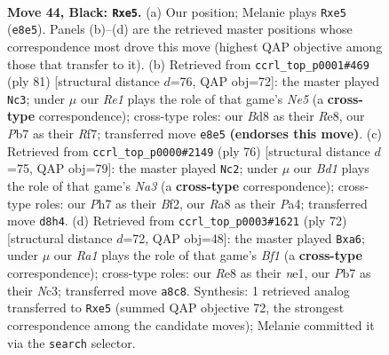 \documentclass[11pt]{article}
\begin{document}
\clearpage

\begin{figure}[p]\centering
\begin{subfigure}{0.46\textwidth}\centering
\resizebox{\linewidth}{!}{%
\newchessgame
\chessboard[
  setfen={r2br3/1p5p/nk4pP/p3Pp2/P2p4/3R2P1/1B2N3/R6K b - - 1 44},
  showmover=false,
  pgfstyle=straightmove, color=movearrow, markmove={e8-e5}
]}
\caption{}
\end{subfigure}\hfill
\begin{subfigure}{0.46\textwidth}\centering
\resizebox{\linewidth}{!}{%
\newchessgame
\chessboard[
  setfen={4r1k1/5r1p/5p2/R2p1P2/1p1PnN2/6P1/P3p2P/4R2K b - - 1 41},
  showmover=false,
  pgfstyle=straightmove, color=movearrow, markmove={e4-c3}
]}
\caption{}
\end{subfigure}
\\[4pt]
\begin{subfigure}{0.46\textwidth}\centering
\resizebox{\linewidth}{!}{%
\newchessgame
\chessboard[
  setfen={2k3r1/1pp5/5b2/2Pr1p2/PP1P1P2/N4K1p/5B1P/3R4 w - - 0 39},
  showmover=false,
  pgfstyle=straightmove, color=movearrow, markmove={a3-c2}
]}
\caption{}
\end{subfigure}\hfill
\begin{subfigure}{0.46\textwidth}\centering
\resizebox{\linewidth}{!}{%
\newchessgame
\chessboard[
  setfen={3rk3/5p1p/p3p1r1/6P1/5P2/P1N3R1/KPP4P/4nB2 w - - 2 37},
  showmover=false,
  pgfstyle=straightmove, color=movearrow, markmove={f1-a6}
]}
\caption{}
\end{subfigure}
\caption{\textbf{Move 44, Black: \texttt{Rxe5}.} (a) Our position; Melanie plays \texttt{Rxe5} (\texttt{e8e5}). Panels (b)--(d) are the retrieved master positions whose correspondence most drove this move (highest QAP objective among those that transfer to it). (b) Retrieved from \texttt{ccrl\_top\_p0001\#469} (ply 81) [structural distance $d$=76, QAP obj=72]: the master played \texttt{Nc3}; under $\mu$ our \emph{Re1} plays the role of that game's \emph{Ne5} (a \textbf{cross-type} correspondence); cross-type roles: our \emph{B}d8 as their \emph{R}e8, our \emph{P}b7 as their \emph{R}f7; transferred move \texttt{e8e5} \textbf{(endorses this move)}. (c) Retrieved from \texttt{ccrl\_top\_p0000\#2149} (ply 76) [structural distance $d$=75, QAP obj=79]: the master played \texttt{Nc2}; under $\mu$ our \emph{Bd1} plays the role of that game's \emph{Na3} (a \textbf{cross-type} correspondence); cross-type roles: our \emph{P}h7 as their \emph{B}f2, our \emph{R}a8 as their \emph{P}a4; transferred move \texttt{d8h4}. (d) Retrieved from \texttt{ccrl\_top\_p0003\#1621} (ply 72) [structural distance $d$=72, QAP obj=48]: the master played \texttt{Bxa6}; under $\mu$ our \emph{Ra1} plays the role of that game's \emph{Bf1} (a \textbf{cross-type} correspondence); cross-type roles: our \emph{R}e8 as their \emph{n}e1, our \emph{P}b7 as their \emph{N}c3; transferred move \texttt{a8c8}. Synthesis: 1 retrieved analog transferred to \texttt{Rxe5} (summed QAP objective 72, the strongest correspondence among the candidate moves); Melanie committed it via the \texttt{search} selector.}
\label{fig:thought-m87}
\end{figure}
\end{document}
